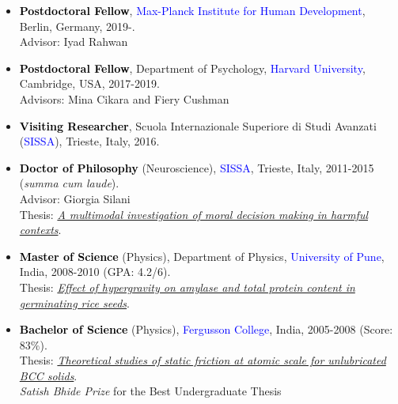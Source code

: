 \documentclass[10pt]{article}
\begin{document}
	\header
	
    
    \begin{itemize}
	
	\item \textbf{\textcolor{black}{Postdoctoral Fellow}}, \textcolor{blue}{Max-Planck Institute for Human Development}, Berlin, Germany, 2019-.\\
	Advisor: Iyad Rahwan
	
	
	\item \textbf{\textcolor{black}{Postdoctoral Fellow}}, Department of Psychology, \textcolor{blue}{Harvard University}, Cambridge, USA, 2017-2019.\\
	Advisors: Mina Cikara and Fiery Cushman
	
	
	\item \textbf{\textcolor{black}{Visiting Researcher}}, Scuola Internazionale Superiore di Studi Avanzati (\textcolor{blue}{SISSA}), Trieste, Italy, 2016.
	
	\end{itemize}
	
	
	\begin{itemize}
	
	\item \textbf{\textcolor{black}{Doctor of Philosophy}} (Neuroscience), \textcolor{blue}{SISSA}, Trieste, Italy, 2011-2015 (\textit{summa cum laude}).\\ 
	Advisor: Giorgia Silani\\
	Thesis: \href{https://drive.google.com/open?id=1g8L7pf-SutYTWt-8yJ44bV96cixMBZuh}{\it A multimodal investigation of moral decision making in harmful contexts}.
	 
	
	\item \textbf{\textcolor{black}{Master of Science}} (Physics), Department of Physics, \textcolor{blue}{University of Pune}, India, 2008-2010 (GPA: 4.2/6).\\
	Thesis: \href{https://drive.google.com/open?id=0B6_u70YpdJKnMTJEMkI2RkQyNjc2QjJFOTowLjEx}{\it Effect of hypergravity on amylase and total protein content in germinating rice seeds}.
	
	
	\item \textbf{\textcolor{black}{Bachelor of Science}} (Physics), \textcolor{blue}{Fergusson College}, India, 2005-2008 (Score: 83$\%$).\\
	Thesis: \href{https://drive.google.com/open?id=0B6_u70YpdJKnMTIxNTkyODMxMzBBMkYyMDowLjEz}{\it Theoretical studies of static friction at atomic scale for unlubricated BCC solids}.\\
	{\it Satish Bhide Prize} for the Best Undergraduate Thesis 
	
	
	
    \end{itemize}
    
\end{document}
